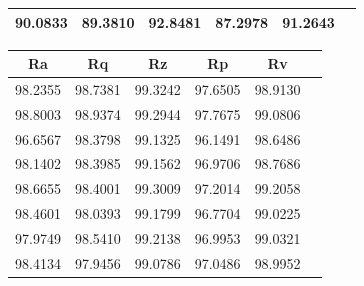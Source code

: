 \documentclass[suppldata]{interact}
\begin{document}
\begin {landscape}
\begin{minipage}{0.30\textwidth}
\begin{tabular}{|c|c|c|c|c|c|}
        90.0833 & 89.3810 & 92.8481 & 87.2978 & 91.2643 \\ \hline
    \end{tabular}
        \label{tab:rpmapetr}
    \end{minipage}
    \hfill 
        \begin{minipage}{0.40\textwidth}
        \small
    \begin{tabular}{|c|c|c|c|c|c|}
    \hline
       Ra &  Rq &  Rz &  Rp & Rv \\ \hline
        98.2355 & 98.7381 & 99.3242 & 97.6505 & 98.9130 \\ \hline
        98.8003 & 98.9374 & 99.2944 & 97.7675 & 99.0806 \\ \hline
        96.6567 & 98.3798 & 99.1325 & 96.1491 & 98.6486 \\ \hline
        98.1402 & 98.3985 & 99.1562 & 96.9706 & 98.7686 \\ \hline
        98.6655 & 98.4001 & 99.3009 & 97.2014 & 99.2058 \\ \hline
        98.4601 & 98.0393 & 99.1799 & 96.7704 & 99.0225 \\ \hline
        97.9749 & 98.5410 & 99.2138 & 96.9953 & 99.0321 \\ \hline
        98.4134 & 97.9456 & 99.0786 & 97.0486 & 98.9952 \\ \hline
    \end{tabular}
        \label{tab:rpr2tr}
    \end{minipage}
    \hfill 

\end{landscape}
\end{document}
